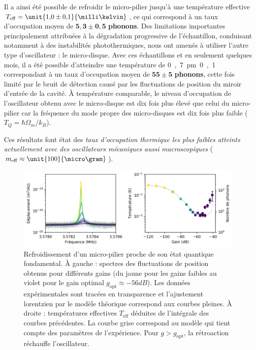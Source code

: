 \documentclass[12pt,a4paper]{article}
\begin{document}
Il a ainsi été possible de refroidir le micro-pilier jusqu'à une température effective $T_\mathrm{eff} = \unit{1{,}0\pm 0{,}1}{\milli\kelvin}$, ce qui correspond à un taux d'occupation moyen de $\mathbf{5{,}3 \pm 0{,}5}$ \textbf{phonons}.
Des limitations importantes principalement attribuées à la dégradation progressive de l'échantillon, conduisant notamment à des instabilités photothermiques, nous ont amenés à utiliser l'autre type d'oscillateur : le micro-disque.
Avec ces échantillons et en seulement quelques mois, il a été possible d'atteindre une température de \unit{0{,}7\pm 0{,}1}{\milli\kelvin} correspondant à un taux d'occupation moyen de $\mathbf{55\pm5}$ \textbf{phonons}, cette fois limité par le bruit de détection causé par les fluctuations de position du miroir d'entrée de la cavité.
À température comparable, le niveau d'occupation de l'oscillateur obtenu avec le micro-disque est dix fois plus élevé que celui du micro-pilier car la fréquence du mode propre des micro-disques est dix fois plus faible ($T_Q = \hbar\Omega_m/k_B$).

Ces résultats font état des \textit{taux d'occupation thermique les plus faibles atteints actuellement avec des oscillateurs mécaniques aussi macroscopiques} ($m_\mathrm{eff}\approx\unit{100}{\micro\gram}$). 

\begin{figure}
\center
\includegraphics[scale=0.75]{figures/feedback_cooling_6phonons.png}
\caption{Refroidissement d'un micro-pilier proche de son état quantique fondamental.
À gauche : spectres des fluctuations de position obtenus pour différents gains (du jaune pour les gains faibles au violet pour le gain optimal $g_\mathrm{opt}\approx\unit{-56}{dB}$).
Les données expérimentales sont tracées en transparence et l'ajustement lorentzien par le modèle théorique correspond aux courbes pleines.
À droite : températures effectives $T_\mathrm{eff}$ déduites de l'intégrale des courbes précédentes.
La courbe grise correspond au modèle qui tient compte des paramètres de l'expérience.
Pour $g>g_\mathrm{opt}$, la rétroaction réchauffe l'oscillateur.}
\label{fig:feedback_cooling_pillar}
\end{figure}
\end{document}
